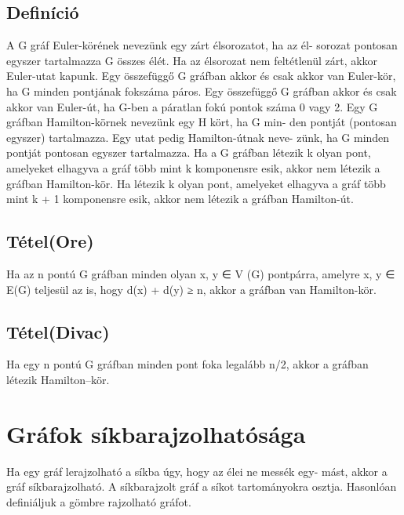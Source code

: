 \documentclass[12pt,a4paper,twoside]{report}
\begin{document}
\subsection{Definíció}
A G gráf Euler-körének nevezünk egy zárt élsorozatot, ha az él-
sorozat pontosan egyszer tartalmazza G összes élét. Ha az élsorozat nem feltétlenül
zárt, akkor Euler-utat kapunk.
\ttl
Egy összefüggő G gráfban akkor és csak akkor van Euler-kör, ha G
minden pontjának fokszáma páros.
\ttl
 Egy összefüggő G gráfban akkor és csak akkor van Euler-út, ha G-ben
a páratlan fokú pontok száma 0 vagy 2.
\df
Egy G gráfban Hamilton-körnek nevezünk egy H kört, ha G min-
den pontját (pontosan egyszer) tartalmazza. Egy utat pedig Hamilton-útnak neve-
zünk, ha G minden pontját pontosan egyszer tartalmazza.
\ttl
Ha a G gráfban létezik k olyan pont, amelyeket elhagyva a gráf több
mint k komponensre esik, akkor nem létezik a gráfban Hamilton-kör. Ha létezik
k olyan pont, amelyeket elhagyva a gráf több mint k + 1 komponensre esik, akkor
nem létezik a gráfban Hamilton-út.
\subsection{Tétel(Ore)}
Ha az n pontú G gráfban minden olyan x, y ∈ V (G) pontpárra,
amelyre {x, y} ∈ E(G) teljesül az is, hogy d(x) + d(y) ≥ n, akkor a gráfban van
Hamilton-kör.
\subsection{Tétel(Divac)}
Ha egy n pontú G gráfban minden pont foka legalább n/2,
akkor a gráfban létezik Hamilton–kör.
\section{Gráfok síkbarajzolhatósága}
\df
Ha egy gráf lerajzolható a síkba úgy, hogy az élei ne messék egy-
mást, akkor a gráf síkbarajzolható. A síkbarajzolt gráf a síkot tartományokra
osztja. Hasonlóan definiáljuk a gömbre rajzolható gráfot.
\end{document}
